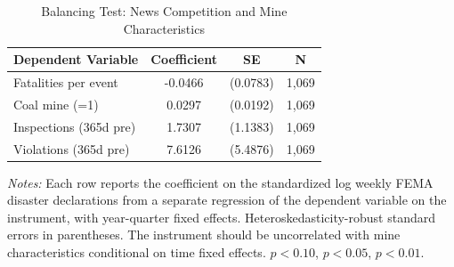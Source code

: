 \begin{table}[H]
\centering
\caption{Balancing Test: News Competition and Mine Characteristics}
\begin{threeparttable}
\begin{tabular}{lccc}
\toprule
Dependent Variable & Coefficient & SE & N \\
\midrule
Fatalities per event & -0.0466 & (0.0783) & 1,069 \\
Coal mine (=1) & 0.0297 & (0.0192) & 1,069 \\
Inspections (365d pre) & 1.7307 & (1.1383) & 1,069 \\
Violations (365d pre) & 7.6126 & (5.4876) & 1,069 \\
\bottomrule
\end{tabular}
\begin{tablenotes}[flushleft]
\small
\item \textit{Notes:} Each row reports the coefficient on the standardized log weekly FEMA disaster declarations from a separate regression of the dependent variable on the instrument, with year-quarter fixed effects. Heteroskedasticity-robust standard errors in parentheses. The instrument should be uncorrelated with mine characteristics conditional on time fixed effects. \sym{*} \(p<0.10\), \sym{**} \(p<0.05\), \sym{***} \(p<0.01\).
\end{tablenotes}
\end{threeparttable}
\label{tab:balance}
\end{table}

